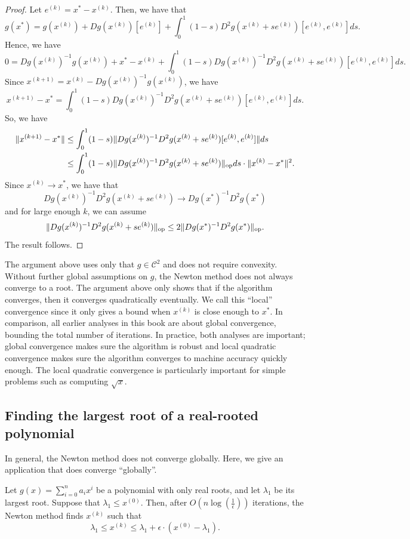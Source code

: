 \begin{proof}
Let $e^{(k)}=x^{*}-x^{(k)}$. Then, we have that
\[
g(x^{*})=g(x^{(k)})+Dg(x^{(k)})[e^{(k)}]+\int^{1}_{0}(1-s)D^{2}g(x^{(k)}+se^{(k)})[e^{(k)},e^{(k)}]ds.
\]
Hence, we have
\[
0=Dg(x^{(k)})^{-1}g(x^{(k)})+x^{*}-x^{(k)}+\int^{1}_{0}(1-s)Dg(x^{(k)})^{-1}D^{2}g(x^{(k)}+se^{(k)})[e^{(k)},e^{(k)}]ds.
\]
Since $x^{(k+1)}=x^{(k)}-Dg(x^{(k)})^{-1}g(x^{(k)})$, we have
\[
x^{(k+1)}-x^{*}=\int^{1}_{0}(1-s)Dg(x^{(k)})^{-1}D^{2}g(x^{(k)}+se^{(k)})[e^{(k)},e^{(k)}]ds.
\]
So, we have
\begin{align*}
\|x^{(k+1)}-x^{*}\| & \leq\int^{1}_{0}(1-s)\|Dg(x^{(k)})^{-1}D^{2}g(x^{(k)}+se^{(k)})[e^{(k)},e^{(k)}]\|ds\\
 & \leq\int^{1}_{0}(1-s)\|Dg(x^{(k)})^{-1}D^{2}g(x^{(k)}+se^{(k)})\|_{\mathrm{op}}ds\cdot\|x^{(k)}-x^{*}\|^{2}.
\end{align*}
Since $x^{(k)}\rightarrow x^{*}$, we have that 
\[
Dg(x^{(k)})^{-1}D^{2}g(x^{(k)}+se^{(k)})\rightarrow Dg(x^{*})^{-1}D^{2}g(x^{*})
\]
and for large enough $k$, we can assume 
\[
\|Dg(x^{(k)})^{-1}D^{2}g(x^{(k)}+se^{(k)})\|_{\mathrm{op}}\le2\|Dg(x^{*})^{-1}D^{2}g(x^{*})\|_{\mathrm{op}}.
\]
The result follows.
\end{proof}
The argument above uses only that $g\in\mathcal{C}^{2}$ and does
not require convexity. Without further global assumptions on $g$,
the Newton method does not always converge to a root. The argument
above only shows that if the algorithm converges, then it converges
quadratically eventually. We call this ``local'' convergence since
it only gives a bound when $x^{(k)}$ is close enough to $x^{*}$.
In comparison, all earlier analyses in this book are about global
convergence, bounding the total number of iterations. In practice,
both analyses are important; global convergence makes sure the algorithm
is robust and local quadratic convergence makes sure the algorithm
converges to machine accuracy quickly enough. The local quadratic
convergence is particularly important for simple problems such as
computing $\sqrt{x}$.

\subsection*{Finding the largest root of a real-rooted polynomial}

In general, the Newton method does not converge globally. Here, we
give an application that does converge ``globally''.
\begin{thm}
Let $g(x)=\sum^{n}_{i=0}a_{i}x^{i}$ be a polynomial with only real
roots, and let $\lambda_{1}$ be its largest root. Suppose that $\lambda_{1}\leq x^{(0)}$.
Then, after $O(n\log(\frac{1}{\epsilon}))$ iterations, the Newton
method finds $x^{(k)}$ such that
\[
\lambda_{1}\leq x^{(k)}\leq\lambda_{1}+\epsilon\cdot(x^{(0)}-\lambda_{1}).
\]
\end{thm}

